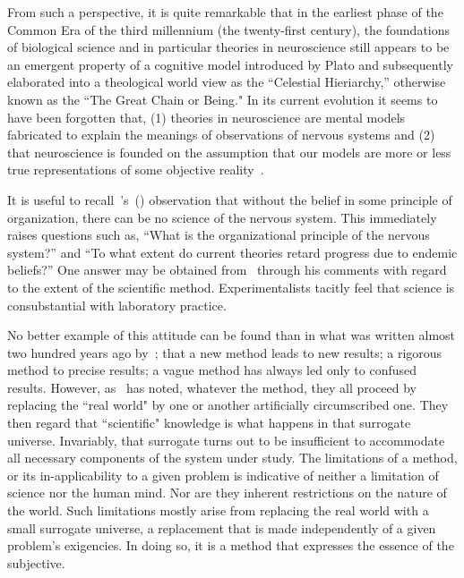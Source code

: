 \documentclass[11pt,3p,twocolumn]{JMN}
\begin{document}
From such a perspective, it is quite remarkable that in the earliest phase of the Common Era of the third millennium (the twenty-first century), the foundations of biological science and in particular theories in neuroscience still appears to be an emergent property of a cognitive model introduced by Plato and subsequently elaborated into a theological world view as the ``Celestial Hieriarchy,'' otherwise known as the ``The Great Chain or Being." In its current evolution it seems to have been forgotten that, (1) theories in neuroscience are mental models fabricated to explain the meanings of observations of nervous systems and (2) that neuroscience is founded on the assumption that our models are more or less true representations of some objective reality~\citep{jacobson93}.

It is useful to recall~\citeauthor{jacobson93}'s~(\citeyear{jacobson93}) observation that without the belief in some principle of organization, there can be no science of the nervous system. This immediately raises questions such as, ``What is the organizational principle of the nervous system?'' and ``To what extent do current theories retard progress due to endemic beliefs?'' One answer may be obtained from~\citet{rosen96} through his comments with regard to the extent of the scientific method. Experimentalists tacitly feel that science is consubstantial with laboratory practice.

No better example of this attitude can be found than in what was written almost two hundred years ago by~\citet{flourens24}; that a new method leads to new results; a rigorous method to precise results; a vague method has always led only to confused results. However, as~\citet{rosen96} has noted, whatever the method, they all proceed by replacing the ``real world" by one or another artificially circumscribed one. They then regard that ``scientific" knowledge is what happens in that surrogate universe. Invariably, that surrogate turns out to be insufficient to accommodate all necessary components of the system under study. The limitations of a method, or its in-applicability to a given problem is indicative of neither a limitation of science nor the human mind. Nor are they inherent restrictions on the nature of the world.  Such limitations mostly arise from replacing the real world with a small surrogate universe, a replacement that is made independently of a given problem's exigencies. In doing so, it is a method that expresses the essence of the subjective.
\end{document}
